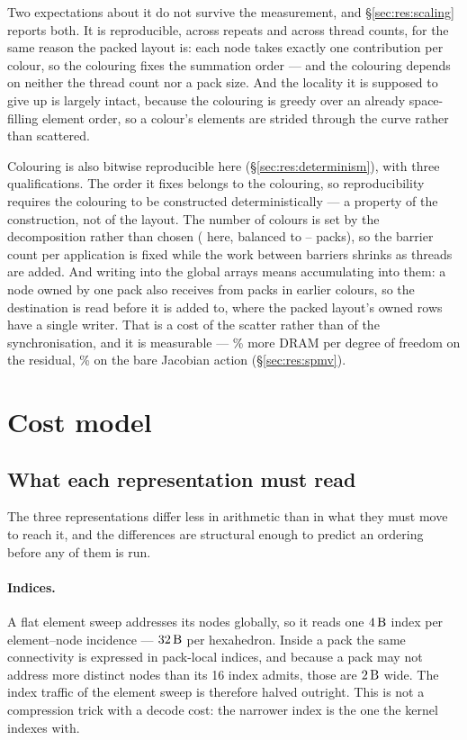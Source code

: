 \documentclass[sigconf,nonacm]{acmart}
\begin{document}
Two expectations about it do not survive the measurement, and \S\ref{sec:res:scaling} reports
both. It is reproducible, across repeats and across thread counts, for the same reason the packed
layout is: each node takes exactly one contribution per colour, so the colouring fixes the
summation order --- and the colouring depends on neither the thread count nor a pack size. And
the locality it is supposed to give up is largely intact, because the colouring is greedy over an
already space-filling element order, so a colour's elements are strided through the curve rather
than scattered.

Colouring is also bitwise reproducible here (\S\ref{sec:res:determinism}), with three
qualifications. The order it fixes belongs to the colouring, so reproducibility requires the
colouring to be constructed deterministically --- a property of the construction, not of the
layout. The number of colours is set by the decomposition rather than chosen (\campNColors{}
here, balanced to \campColorPacksLo{}--\campColorPacksHi{} packs), so the barrier count per
application is fixed while the work between barriers shrinks as threads are added. And writing
into the global arrays means accumulating into them: a node owned by one pack also receives from
packs in earlier colours, so the destination is read before it is added to, where the packed
layout's owned rows have a single writer. That is a cost of the scatter rather than of the
synchronisation, and it is measurable --- \colBytesPctResRc\% more DRAM per degree of freedom on
the residual, \colBytesPctJac\% on the bare Jacobian action (\S\ref{sec:res:spmv}).

\section{Cost model}
\label{sec:cost}

\subsection{What each representation must read}

The three representations differ less in arithmetic than in what they must move to reach it, and
the differences are structural enough to predict an ordering before any of them is run.

\paragraph{Indices.} A flat element sweep addresses its nodes globally, so it reads one
$\SI{4}{\byte}$ index per element--node incidence --- $\SI{32}{\byte}$ per hexahedron. Inside a
pack the same connectivity is expressed in pack-local indices, and because a pack may not
address more distinct nodes than its \SI{16}{\bit} index admits, those are $\SI{2}{\byte}$
wide. The
index traffic of the element sweep is therefore halved outright. This is not a compression trick
with a decode cost: the narrower index is the one the kernel indexes with.
\end{document}
